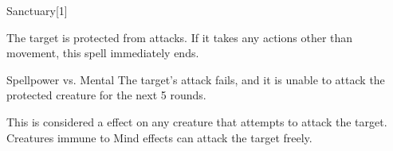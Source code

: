 
\begin{spellsection}{Sanctuary}[1]
    \begin{spellheader}
    \end{spellheader}
    \begin{spellcontent}
        \begin{spelltargetinginfo}
        \end{spelltargetinginfo}
        \begin{spelleffects}
            \spelleffect The target is protected from attacks. If it takes any actions other than movement, this spell immediately ends.
            \spelldur \durshort
        \end{spelleffects}
    \end{spellcontent}
    \begin{spellsubcontent}
        \begin{spelltargetinginfo}
        \end{spelltargetinginfo}
        \begin{spelleffects}
            \begin{spellattack}{Spellpower vs. Mental}
                \spellsuccess The target's attack fails, and it is unable to attack the protected creature for the next 5 rounds.
            \end{spellattack}
        \end{spelleffects}
    \end{spellsubcontent}
    \begin{spellfooter}
        \spellnotes This is considered a  effect on any creature that attempts to attack the target. Creatures immune to Mind effects can attack the target freely.
        \miscastexplode
    \end{spellfooter}
    \begin{spellaugments}
    \end{spellaugments}
\end{spellsection}

